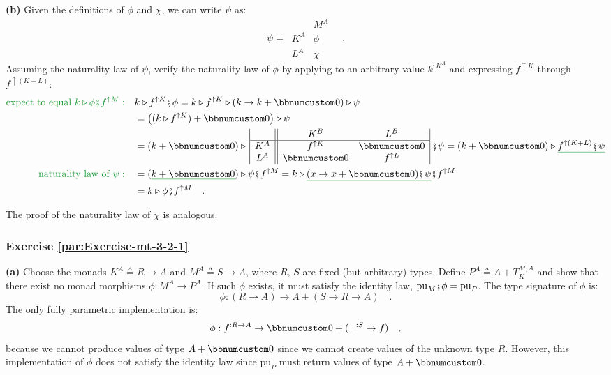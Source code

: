 \textbf{(b)} Given the definitions of $\phi$ and $\chi$, we can
write $\psi$ as:
\[
\psi=\,\begin{array}{|c||c|}
 & M^{A}\\
\hline K^{A} & \phi\\
L^{A} & \chi
\end{array}\quad.
\]
Assuming the naturality law of $\psi$, verify the naturality law
of $\phi$ by applying to an arbitrary value $k^{:K^{A}}$ and expressing
$f^{\uparrow K}$ through $f^{\uparrow(K+L)}$: 
\begin{align*}
{\color{greenunder}\text{expect to equal }k\triangleright\phi\bef f^{\uparrow M}:}\quad & k\triangleright f^{\uparrow K}\bef\phi=k\triangleright f^{\uparrow K}\triangleright(k\rightarrow k+\bbnum 0)\triangleright\psi\\
 & =\big((k\triangleright f^{\uparrow K})+\bbnum 0\big)\triangleright\psi\\
 & =(k+\bbnum 0)\triangleright\,\begin{array}{|c||cc|}
 & K^{B} & L^{B}\\
\hline K^{A} & f^{\uparrow K} & \bbnum 0\\
L^{A} & \bbnum 0 & f^{\uparrow L}
\end{array}\,\bef\psi=(k+\bbnum 0)\triangleright\gunderline{f^{\uparrow(K+L)}\bef\psi}\\
{\color{greenunder}\text{naturality law of }\psi:}\quad & =(\gunderline{k+\bbnum 0})\triangleright\psi\bef f^{\uparrow M}=k\triangleright\gunderline{(x\rightarrow x+\bbnum 0)\bef\psi}\bef f^{\uparrow M}\\
 & =k\triangleright\phi\bef f^{\uparrow M}\quad.
\end{align*}

The proof of the naturality law of $\chi$ is analogous.

\subsubsection*{Exercise \ref{par:Exercise-mt-3-2-1}}

\textbf{(a)} Choose the monads $K^{A}\triangleq R\rightarrow A$ and
$M^{A}\triangleq S\rightarrow A$, where $R$, $S$ are fixed (but
arbitrary) types. Define $P^{A}\triangleq A+T_{K}^{M,A}$ and show
that there exist no monad morphisms $\phi:M^{A}\rightarrow P^{A}$.
If such $\phi$ exists, it must satisfy the identity law, $\text{pu}_{M}\bef\phi=\text{pu}_{P}$.
The type signature of $\phi$ is:
\[
\phi:(R\rightarrow A)\rightarrow A+(S\rightarrow R\rightarrow A)\quad.
\]
The only fully parametric implementation is:
\[
\phi:f^{:R\rightarrow A}\rightarrow\bbnum 0+(\_^{:S}\rightarrow f)\quad,
\]
because we cannot produce values of type $A+\bbnum 0$ since we cannot
create values of the unknown type $R$. However, this implementation
of $\phi$ does not satisfy the identity law since $\text{pu}_{P}$
must return values of type $A+\bbnum 0$.

